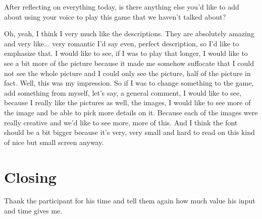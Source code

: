 \begin{QandA}
   \item After reflecting on everything today, is there anything else you’d like to add about using your voice to play this game that we haven't talked about?

         \begin{answered}
            Oh, yeah, I think I very much like the descriptions.
            They are absolutely amazing and very like...
            very romantic I'd say even, perfect description, so I'd like to emphasize that.
            I would like to see, if I was to play that longer, I would like to see a bit more of the picture because it made me somehow suffocate that I could not see the whole picture and I could only see the picture, half of the picture in fact.
            Well, this was my impression.
            So if I was to change something to the game, add something from myself, let's say, a general comment, I would like to see, because I really like the pictures as well, the images, I would like to see more of the image and be able to pick more details on it.
            Because each of the images were really creative and we'd like to see more, more of this.
            And I think the font should be a bit bigger because it's very, very small and hard to read on this kind of
            nice but small screen anyway.
         \end{answered}
\end{QandA}

\section{Closing}
Thank the participant for his time and tell them again how much value his input and time gives me.






